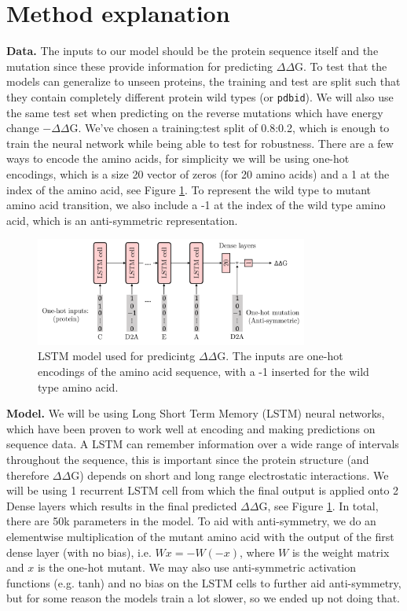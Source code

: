 \documentclass{article}
\begin{document}
\section{Method explanation}

\textbf{Data.} The inputs to our model should be the protein sequence itself and the mutation since these provide information for predicting $\Delta\Delta$G. To test that the models can generalize to unseen proteins, the training and test are split such that they contain completely different protein wild types (or \texttt{pdbid}). We will also use the same test set when predicting on the reverse mutations which have energy change $-\Delta\Delta$G. We've chosen a training:test split of 0.8:0.2, which is enough to train the neural network while being able to test for robustness. There are a few ways to encode the amino acids, for simplicity we will be using one-hot encodings, which is a size 20 vector of zeros (for 20 amino acids) and a 1 at the index of the amino acid, see Figure \ref{fig:lstm}. To represent the wild type to mutant amino acid transition, we also include a -1  at the index of the wild type amino acid, which is an anti-symmetric representation.
\clearpage

\begin{figure}[!htb]
    \centering
    \includegraphics[width=0.8\textwidth]{lstm.pdf}
    \caption{\label{fig:lstm}LSTM model used for predicintg $\Delta\Delta$G. The inputs are one-hot encodings of the amino acid sequence, with a -1 inserted for the wild type amino acid.}
\end{figure}
\FloatBarrier

\textbf{Model.} We will be using Long Short Term Memory (LSTM) neural networks, which have been proven to work well at encoding and making predictions on sequence data. A LSTM can remember information over a wide range of intervals throughout the sequence, this is important since the protein structure (and therefore $\Delta\Delta$G) depends on short and long range electrostatic interactions. We will be using 1 recurrent LSTM cell from which the final output is applied onto 2 Dense layers which results in the final predicted $\Delta\Delta$G, see Figure \ref{fig:lstm}. In total, there are 50k parameters in the model. To aid with anti-symmetry, we do an elementwise multiplication of the mutant amino acid with the output of the first dense layer (with no bias), i.e. $Wx = -W(-x)$, where $W$ is the weight matrix and $x$ is the one-hot mutant. We may also use anti-symmetric activation functions (e.g. tanh) and no bias on the LSTM cells to further aid anti-symmetry, but for some reason the models train a lot slower, so we ended up not doing that.
\end{document}
